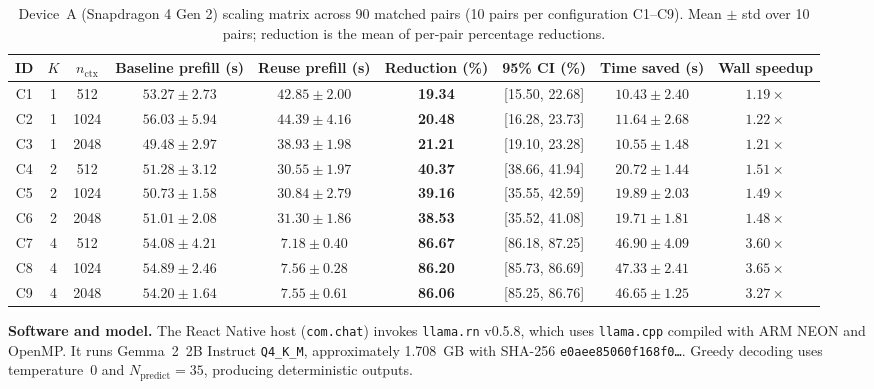 \documentclass[10pt,conference]{IEEEtran}
\begin{document}
\begin{table}[!t]
\centering
\caption{Device~A (Snapdragon 4 Gen 2) scaling matrix across 90 matched pairs (10 pairs per configuration C1--C9). Mean $\pm$ std over 10 pairs; reduction is the mean of per-pair percentage reductions.}
\label{tab:scaling_matrix}
\scriptsize
\setlength{\tabcolsep}{4pt}
\renewcommand{\arraystretch}{0.98}
\begin{tabular}{ccccccccc}
\toprule
\textbf{ID} & $K$ & $n_{\text{ctx}}$ & \textbf{Baseline prefill (s)} & \textbf{Reuse prefill (s)} & \textbf{Reduction (\%)} & \textbf{95\% CI (\%)} & \textbf{Time saved (s)} & \textbf{Wall speedup} \\
\midrule
C1 & 1 & 512  & $53.27\pm2.73$ & $42.85\pm2.00$ & \textbf{19.34} & [15.50, 22.68] & $10.43\pm2.40$ & $1.19\times$ \\
C2 & 1 & 1024 & $56.03\pm5.94$ & $44.39\pm4.16$ & \textbf{20.48} & [16.28, 23.73] & $11.64\pm2.68$ & $1.22\times$ \\
C3 & 1 & 2048 & $49.48\pm2.97$ & $38.93\pm1.98$ & \textbf{21.21} & [19.10, 23.28] & $10.55\pm1.48$ & $1.21\times$ \\
\midrule
C4 & 2 & 512  & $51.28\pm3.12$ & $30.55\pm1.97$ & \textbf{40.37} & [38.66, 41.94] & $20.72\pm1.44$ & $1.51\times$ \\
C5 & 2 & 1024 & $50.73\pm1.58$ & $30.84\pm2.79$ & \textbf{39.16} & [35.55, 42.59] & $19.89\pm2.03$ & $1.49\times$ \\
C6 & 2 & 2048 & $51.01\pm2.08$ & $31.30\pm1.86$ & \textbf{38.53} & [35.52, 41.08] & $19.71\pm1.81$ & $1.48\times$ \\
\midrule
C7 & 4 & 512  & $54.08\pm4.21$ & $7.18\pm0.40$  & \textbf{86.67} & [86.18, 87.25] & $46.90\pm4.09$ & $3.60\times$ \\
C8 & 4 & 1024 & $54.89\pm2.46$ & $7.56\pm0.28$  & \textbf{86.20} & [85.73, 86.69] & $47.33\pm2.41$ & $3.65\times$ \\
C9 & 4 & 2048 & $54.20\pm1.64$ & $7.55\pm0.61$  & \textbf{86.06} & [85.25, 86.76] & $46.65\pm1.25$ & $3.27\times$ \\
\bottomrule
\end{tabular}
\end{table}

\textbf{Software and model.} The React Native host (\texttt{com.chat}) invokes \texttt{llama.rn} v0.5.8, which uses \texttt{llama.cpp} compiled with ARM NEON and OpenMP. It runs Gemma~2~2B Instruct \texttt{Q4\_K\_M}, approximately 1.708~GB with SHA-256 \texttt{e0aee85060f168f0\ldots}. Greedy decoding uses temperature~0 and $N_{\text{predict}}=35$, producing deterministic outputs.
\end{document}
